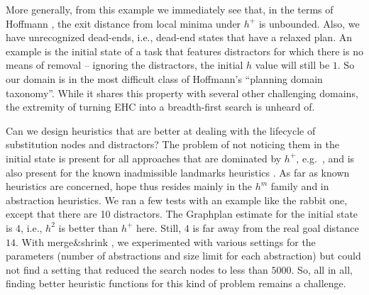 More generally, from this example we immediately see that, in the
terms of Hoffmann , the exit distance from
local minima under $h^+$ is unbounded. Also, we have unrecognized
dead-ends, i.e., dead-end states that have a relaxed plan. An example
is the initial state of a task that features distractors for which
there is no means of removal -- ignoring the distractors, the initial
$h$ value will still be $1$. So our domain is in the most difficult
class of Hoffmann's  ``planning domain
taxonomy''. While it shares this property with several other
challenging domains, the extremity of turning EHC into a breadth-first
search is unheard of.


Can we design heuristics that are better at dealing with the lifecycle
of substitution nodes and distractors? The problem of not noticing
them in the initial state is present for all approaches that are
dominated by $h^+$,
e.g.\ \cite{karpas:domshlak-ijcai-09,helmert:domshlak:icaps-09}, and
is also present for the known inadmissible landmarks heuristics
\cite{richter:etal:aaai-08}. As far as known heuristics are concerned,
hope thus resides mainly in the $h^m$ family and in abstraction
heuristics. We ran a few tests with an example like the rabbit one,
except that there are 10 distractors. The Graphplan estimate for the
initial state is $4$, i.e., $h^2$ is better than $h^+$ here. Still,
$4$ is far away from the real goal distance $14$. %
With merge\&shrink \cite{helmert:etal:icaps07}, we experimented with
various settings for the parameters (number of abstractions and size
limit for each abstraction) but could not find a setting that reduced
the search nodes to less than $5000$. So, all in all, finding better
heuristic functions for this kind of problem remains a challenge.








